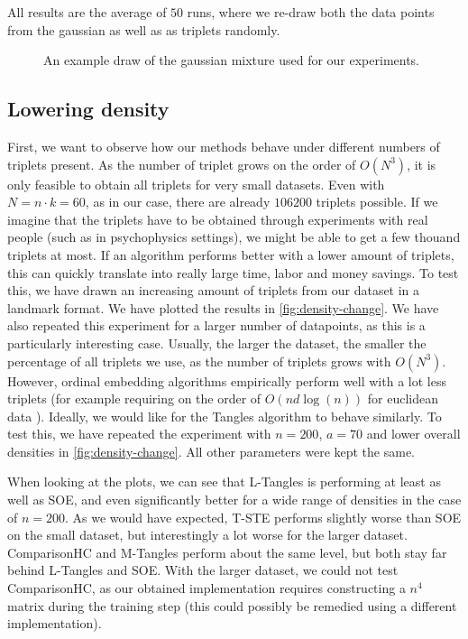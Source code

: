 All results are the average of $50$ runs, where we re-draw both the data points from the gaussian as well as as triplets randomly. 

\begin{figure}[ht]
    \centering
    \resizebox{0.8\textwidth}{!}{}
    \caption{An example draw of the gaussian mixture used for our experiments.}
    \label{fig:dataset-gauss}
\end{figure}

\subsection{Lowering density}\label{sec:lower-density}
First, we want to observe how our methods behave under different numbers of triplets present. As the number of triplet grows on the order of $O(N^3)$, it is only feasible to obtain
all triplets for very small datasets. Even with $N = n \cdot k = 60$, as in our case, there are already $106200$ triplets possible. If we imagine that the triplets have to be obtained 
through experiments with real people (such as in psychophysics settings), we might be able to get a few thouand triplets at most. If an algorithm performs better with a lower amount
of triplets, this can quickly translate into really large time, labor and money savings. To test this, we have drawn an increasing amount of triplets from our dataset in a landmark format.
We have plotted the results in \autoref{fig:density-change}. We have also repeated this experiment for a larger number of datapoints, as this is a particularly interesting case. 
Usually, the larger the dataset, the smaller the percentage of all triplets we use, as the number of triplets grows with $O(N^3)$. However, ordinal embedding algorithms empirically perform well with a lot
less triplets (for example requiring on the order of $O(n d \log(n))$ for euclidean data \citep{jainFiniteSamplePrediction2016}). 
Ideally, we would like for the Tangles algorithm to behave similarly. To test this, we have repeated the experiment with $n=200$, $a=70$ and lower overall densities in \autoref{fig:density-change}.
All other parameters were kept the same.

When looking at the plots, we can see that L-Tangles is performing at least as well as SOE, and even significantly better for a wide range of densities in the case of $n=200$. 
As we would have expected, T-STE performs slightly worse than SOE on the small dataset, but interestingly a lot worse for the larger dataset. ComparisonHC and M-Tangles
perform about the same level, but both stay far behind L-Tangles and SOE. With the larger dataset, we could not test ComparisonHC, as our obtained implementation requires 
constructing a $n^4$ matrix during the training step (this could possibly be remedied using a different implementation).

